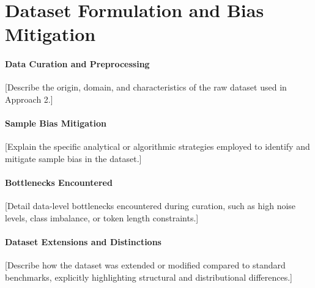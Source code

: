 \section{Dataset Formulation and Bias Mitigation}
\label{sec:app2_datasets}


\paragraph{Data Curation and Preprocessing}
[Describe the origin, domain, and characteristics of the raw dataset used in Approach 2.]

\paragraph{Sample Bias Mitigation}
[Explain the specific analytical or algorithmic strategies employed to identify and mitigate sample bias in the dataset.]

\paragraph{Bottlenecks Encountered}
[Detail data-level bottlenecks encountered during curation, such as high noise levels, class imbalance, or token length constraints.]

\paragraph{Dataset Extensions and Distinctions}
[Describe how the dataset was extended or modified compared to standard benchmarks, explicitly highlighting structural and distributional differences.]
